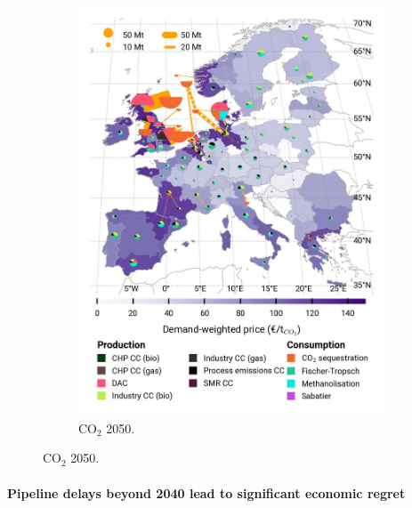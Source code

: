 \documentclass[pdflatex,sn-nature]{sn-jnl}%
\theoremstyle{thmstyleone}%
\theoremstyle{thmstyletwo}%
\theoremstyle{thmstylethree}%
\begin{document}
\begin{figure}[htbp]
\begin{subfigure}[t]{0.32\textwidth}
      \includegraphics[width=1\textwidth]{figures/maps/pcipmi/base_s_adm___2050-balance_map_co2_stored.jpg} 
      \caption{CO$_2$ 2050.}
      \label{fig:PCI_lt_2050_co2}
  \end{subfigure}
  \vspace{0.3cm}
  \label{fig:PCI_lt}
\end{figure}

\paragraph{Pipeline delays beyond 2040 lead to significant economic regret}
\end{document}

